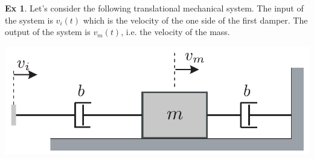 \documentclass[twoside]{article}
\theoremstyle{definition}
\newtheorem{exmp}[theorem]{Ex}
\begin{document}
\begin{exmp}
Let's consider the following translational mechanical system. The
input of the system is $v_i(t)$ which is the velocity of the one side
of the first damper. The output of the system is $v_m(t)$, i.e. the velocity of the mass. 
\end{exmp}

  \begin{minipage}[h]{0.5\linewidth}
    \begin{center}
      \includegraphics[width=1\textwidth]{example}
    \end{center}
  \end{minipage}

  \vspace{6pt}
\end{document}
